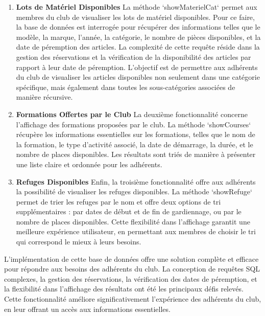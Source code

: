 \begin{enumerate}

\item \textbf{Lots de Matériel Disponibles}
La méthode `showMaterielCat` permet aux membres du club de visualiser les lots de matériel disponibles. Pour ce faire, la base de données est interrogée pour récupérer des informations telles que le modèle, la marque, l'année, la catégorie, le nombre de pièces disponibles, et la date de péremption des articles. La complexité de cette requête réside dans la gestion des réservations et la vérification de la disponibilité des articles par rapport à leur date de péremption.
 L'objectif est de permettre aux adhérents du club de visualiser les articles disponibles non seulement dans une catégorie spécifique, mais également dans toutes les sous-catégories associées de manière récursive.

\item \textbf{Formations Offertes par le Club}
La deuxième fonctionnalité concerne l'affichage des formations proposées par le club. La méthode `showCourses` récupère les informations essentielles sur les formations, telles que le nom de la formation, le type d'activité associé, la date de démarrage, la durée, et le nombre de places disponibles. Les résultats sont triés de manière à présenter une liste claire et ordonnée pour les adhérents.

\item \textbf{Refuges Disponibles}
Enfin, la troisième fonctionnalité offre aux adhérents la possibilité de visualiser les refuges disponibles. La méthode `showRefuge` permet de trier les refuges par le nom et offre deux options de tri supplémentaires : par dates de début et de fin de gardiennage, ou par le nombre de places disponibles. Cette flexibilité dans l'affichage garantit une meilleure expérience utilisateur, en permettant aux membres de choisir le tri qui correspond le mieux à leurs besoins.
\end{enumerate}

\par L'implémentation de cette base de données offre une solution complète et efficace pour répondre aux besoins des adhérents du club. La conception de requêtes SQL complexes, la gestion des réservations, la vérification des dates de péremption, et la flexibilité dans l'affichage des résultats ont été les principaux défis relevés. Cette fonctionnalité améliore significativement l'expérience des adhérents du club, en leur offrant un accès aux informations essentielles. 


